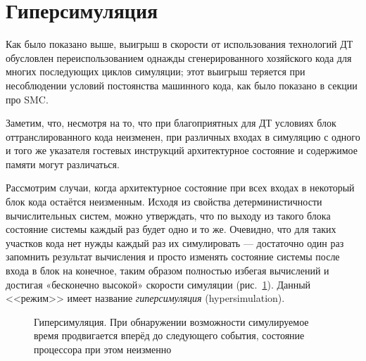 \section{Гиперсимуляция}\label{sec:hypersim}

Как было показано выше, выигрыш в скорости от использования технологий ДТ обусловлен переиспользованием однажды сгенерированного хозяйского кода для многих последующих циклов симуляции; этот выигрыш теряется при несоблюдении условий постоянства машинного кода, как было показано в секции про SMC. 

Заметим, что, несмотря на то, что при благоприятных для ДТ условиях блок оттранслированного кода неизменен, при различных входах в симуляцию с одного и того же указателя гостевых инструкций архитектурное состояние и содержимое памяти могут различаться. 

Рассмотрим случаи, когда архитектурное состояние при всех входах в некоторый блок кода остаётся неизменным. Исходя из свойства детерминистичности вычислительных систем, можно утверждать, что по выходу из такого блока состояние системы каждый раз будет одно и то же. Очевидно, что для таких участков кода нет нужды каждый раз их симулировать --- достаточно один раз запомнить результат вычисления и просто изменять состояние системы после входа в блок на конечное, таким образом полностью избегая вычислений и достигая «бесконечно высокой» скорости симуляции (рис.~\ref{fig:hypersim}). Данный <<режим>> имеет название \textit{гиперсимуляция} (\abbr hypersimulation).

\begin{figure}[htb]
    \centering
    \caption[Гиперсимуляция]{Гиперсимуляция. При обнаружении возможности симулируемое время продвигается вперёд до следующего события, состояние процессора при этом неизменно}
    \label{fig:hypersim}
\end{figure}

